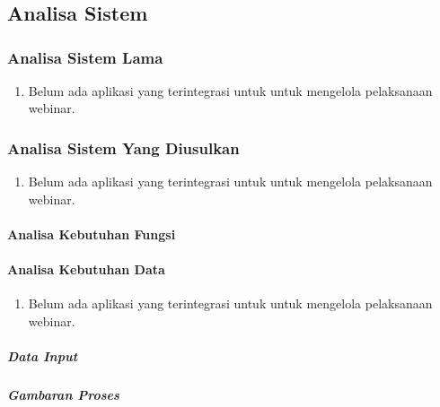 \chapter{\babTiga}

\section{Analisa Sistem}

\lipsum[1]

\subsection{Analisa Sistem Lama}

\lipsum[1]
\begin{enumerate}
  \item Belum ada aplikasi yang terintegrasi untuk untuk mengelola pelaksanaan webinar.
\end{enumerate}

\subsection{Analisa Sistem Yang Diusulkan}

\lipsum[1]
\begin{enumerate}
  \item Belum ada aplikasi yang terintegrasi untuk untuk mengelola pelaksanaan webinar.
\end{enumerate}


\subsubsection{Analisa Kebutuhan Fungsi}

\subsubsection{Analisa Kebutuhan Data}

\lipsum[1]
\begin{enumerate}
  \item Belum ada aplikasi yang terintegrasi untuk untuk mengelola pelaksanaan webinar.
\end{enumerate}


\paragraph{Data Input}

\paragraph{Gambaran Proses}


